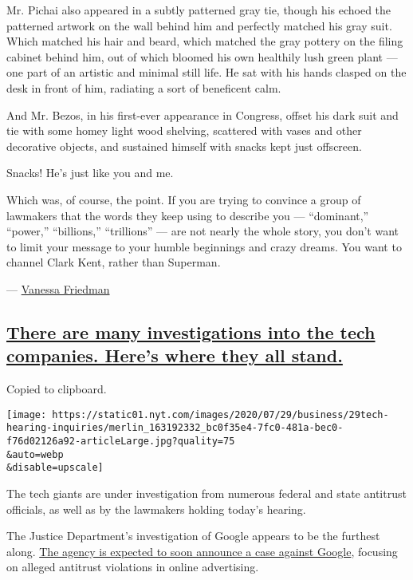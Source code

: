 Mr. Pichai also appeared in a subtly patterned gray tie, though his
echoed the patterned artwork on the wall behind him and perfectly
matched his gray suit. Which matched his hair and beard, which matched
the gray pottery on the filing cabinet behind him, out of which bloomed
his own healthily lush green plant --- one part of an artistic and
minimal still life. He sat with his hands clasped on the desk in front
of him, radiating a sort of beneficent calm.

And Mr. Bezos, in his first-ever appearance in Congress, offset his dark
suit and tie with some homey light wood shelving, scattered with vases
and other decorative objects, and sustained himself with snacks kept
just offscreen.

Snacks! He's just like you and me.

Which was, of course, the point. If you are trying to convince a group
of lawmakers that the words they keep using to describe you ---
``dominant,'' ``power,'' ``billions,'' ``trillions'' --- are not nearly
the whole story, you don't want to limit your message to your humble
beginnings and crazy dreams. You want to channel Clark Kent, rather than
Superman.

--- \href{https://www.nytimes.com/by/vanessa-friedman}{Vanessa Friedman}

\hypertarget{there-are-many-investigations-into-the-tech-companies-heres-where-they-all-stand}{%
\subsection{\texorpdfstring{\protect\hyperlink{there-are-many-investigations-into-the-tech-companies-heres-where-they-all-stand}{There
are many investigations into the tech companies. Here's where they all
stand.}}{There are many investigations into the tech companies. Here's where they all stand.}}\label{there-are-many-investigations-into-the-tech-companies-heres-where-they-all-stand}}

Copied to clipboard.

\texttt{[image: https://static01.nyt.com/images/2020/07/29/business/29tech-hearing-inquiries/merlin\_163192332\_bc0f35e4-7fc0-481a-bec0-f76d02126a92-articleLarge.jpg?quality=75\\\&auto=webp\\\&disable=upscale]}

The tech giants are under investigation from numerous federal and state
antitrust officials, as well as by the lawmakers holding today's
hearing.

The Justice Department's investigation of Google appears to be the
furthest along.
\href{https://www.nytimes.com/2020/06/25/technology/barr-google-investigation.html}{The
agency is expected to soon announce a case against Google}, focusing on
alleged antitrust violations in online advertising.

